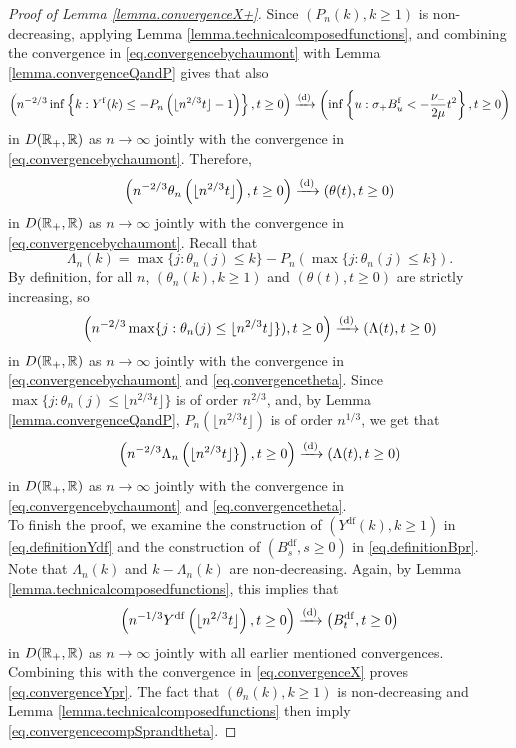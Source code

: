 \begin{proof}[Proof of Lemma \ref{lemma.convergenceX+}]
Since $(P_n(k),k\geq 1)$ is non-decreasing, applying Lemma \ref{lemma.technicalcomposedfunctions}, and combining the convergence in \eqref{eq.convergencebychaumont} with Lemma \ref{lemma.convergenceQandP} gives that also
$$\left(n^{-2/3}\inf\left\{k:Y^{\mathrm{f}}(k) \leq - P_n\left(\lfloor n^{2/3} t \rfloor -1\right)\right\},t\geq 0\right)\xrightarrow[]{\mathrm{(d)}}\left(\inf\left\{u:\sigma_+ B^{\mathrm{f}}_u< -\frac{\nu_-}{2\mu} t^2\right\},t\geq 0\right)$$
  in $D({\mathbb R}_+,{\mathbb R})$ as $n\to \infty$ jointly with the convergence in \eqref{eq.convergencebychaumont}. Therefore, 
 \begin{equation}\label{eq.convergencetheta}\left(n^{-2/3}\theta_n\left(\lfloor n^{2/3}t\rfloor \right),t\geq 0 \right) \xrightarrow[]{\mathrm{(d)}} \left(\theta(t),t\geq 0\right)\end{equation}
  in $D({\mathbb R}_+,{\mathbb R})$ as $n\to \infty$ jointly with the convergence in \eqref{eq.convergencebychaumont}.
Recall that 
$$\Lambda_n(k)=\max\{j:\theta_n(j)\leq k\}-P_n(\max\{j:\theta_n(j)\leq k\}). $$ By definition, for all $n$, $(\theta_n(k),k\geq 1)$ and $(\theta(t),t\geq 0)$ are strictly increasing, so
$$\left(n^{-2/3}\max\{j:\theta_n(j)\leq \lfloor n^{2/3} t \rfloor\} ),t\geq 0\right)\xrightarrow[]{\mathrm{(d)}}\left( \Lambda(t),t\geq0 \right)$$
in $D({\mathbb R}_+,{\mathbb R})$ as $n\to \infty$ jointly with the convergence in \eqref{eq.convergencebychaumont} and \eqref{eq.convergencetheta}. Since $\max\{j:\theta_n(j)\leq \lfloor n^{2/3} t \rfloor\}$ is of order $n^{2/3}$, and, by Lemma \ref{lemma.convergenceQandP}, $P_n(\lfloor n^{2/3}t\rfloor)$ is of order $n^{1/3}$, we get that 
$$\left(n^{-2/3}\Lambda_n\left(\lfloor n^{2/3} t \rfloor\} \right),t\geq 0\right)\xrightarrow[]{\mathrm{(d)}}\left( \Lambda(t),t\geq0 \right)$$
in $D({\mathbb R}_+,{\mathbb R})$ as $n\to \infty$ jointly with the convergence in \eqref{eq.convergencebychaumont} and \eqref{eq.convergencetheta}.\\
To finish the proof, we examine the construction of $(Y^{\mathrm{df}}(k),k\geq 1)$ in \eqref{eq.definitionYdf} and the construction of $(B^{\mathrm{df}}_s,s\geq 0)$ in \eqref{eq.definitionBpr}. 
Note that $\Lambda_n(k)$ and $k-\Lambda_n(k)$ are non-decreasing. Again, by Lemma \ref{lemma.technicalcomposedfunctions}, this implies that 
$$\left(n^{-1/3}Y^{\mathrm{df}}\left( \lfloor n^{2/3} t \rfloor \right), t\geq 0 \right)\xrightarrow[]{\mathrm{(d)}} \left( B^{\mathrm{df}}_{t}, t\geq 0\right)$$
in $D({\mathbb R}_+,{\mathbb R})$ as $n\to \infty$ jointly with all earlier mentioned convergences. Combining this with the convergence in \eqref{eq.convergenceX} proves \eqref{eq.convergenceYpr}. The fact that $(\theta_n(k),k\geq 1)$ is non-decreasing and Lemma \ref{lemma.technicalcomposedfunctions} then imply \eqref{eq.convergencecompSprandtheta}. 
\end{proof}

